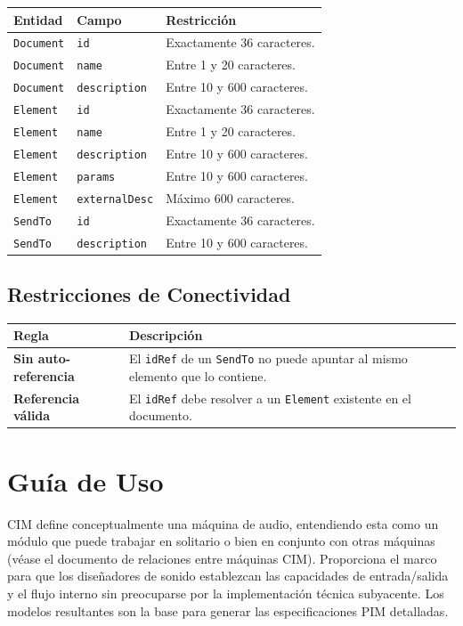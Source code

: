 \begin{table}[H]
\centering
\small
\begin{tabular}{@{}lll@{}}
\toprule
Entidad & Campo & Restricción \\ \midrule
\texttt{Document} & \texttt{id} & Exactamente 36 caracteres. \\
\texttt{Document} & \texttt{name} & Entre 1 y 20 caracteres. \\
\texttt{Document} & \texttt{description} & Entre 10 y 600 caracteres. \\
\texttt{Element} & \texttt{id} & Exactamente 36 caracteres. \\
\texttt{Element} & \texttt{name} & Entre 1 y 20 caracteres. \\
\texttt{Element} & \texttt{description} & Entre 10 y 600 caracteres. \\
\texttt{Element} & \texttt{params} & Entre 10 y 600 caracteres. \\
\texttt{Element} & \texttt{externalDesc} & Máximo 600 caracteres. \\
\texttt{SendTo} & \texttt{id} & Exactamente 36 caracteres. \\
\texttt{SendTo} & \texttt{description} & Entre 10 y 600 caracteres. \\ \bottomrule
\end{tabular}
\end{table}

\subsection{Restricciones de Conectividad}

\begin{table}[H]
\centering
\small
\begin{tabular}{@{}lp{10cm}@{}}
\toprule
Regla & Descripción \\ \midrule
\textbf{Sin auto-referencia} & El \texttt{idRef} de un \texttt{SendTo} no puede apuntar al mismo elemento que lo contiene. \\
\textbf{Referencia válida} & El \texttt{idRef} debe resolver a un \texttt{Element} existente en el documento. \\ \bottomrule
\end{tabular}
\end{table}

\section{Guía de Uso}

CIM define conceptualmente una máquina de audio, entendiendo esta como un módulo que puede trabajar en solitario o bien en conjunto con otras máquinas (véase el documento de relaciones entre máquinas CIM). Proporciona el marco para que los diseñadores de sonido establezcan las capacidades de entrada/salida y el flujo interno sin preocuparse por la implementación técnica subyacente. Los modelos resultantes son la base para generar las especificaciones PIM detalladas.
